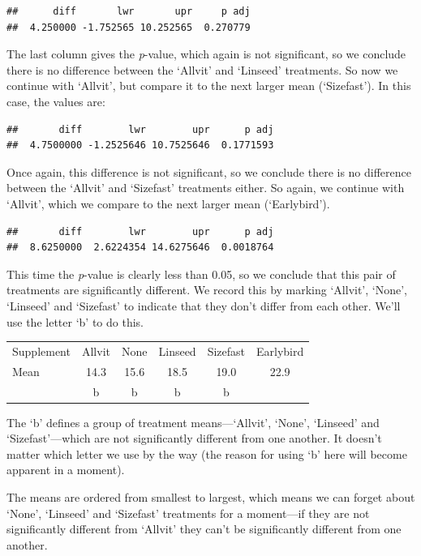 \documentclass[
]{book}
\begin{document}
\begin{verbatim}
##      diff       lwr       upr     p adj 
##  4.250000 -1.752565 10.252565  0.270779
\end{verbatim}

The last column gives the \emph{p}-value, which again is not significant, so we conclude there is no difference between the `Allvit' and `Linseed' treatments. So now we continue with `Allvit', but compare it to the next larger mean (`Sizefast'). In this case, the values are:

\begin{verbatim}
##       diff        lwr        upr      p adj 
##  4.7500000 -1.2525646 10.7525646  0.1771593
\end{verbatim}

Once again, this difference is not significant, so we conclude there is no difference between the `Allvit' and `Sizefast' treatments either. So again, we continue with `Allvit', which we compare to the next larger mean (`Earlybird').

\begin{verbatim}
##       diff        lwr        upr      p adj 
##  8.6250000  2.6224354 14.6275646  0.0018764
\end{verbatim}

This time the \emph{p}-value is clearly less than 0.05, so we conclude that this pair of treatments are significantly different. We record this by marking `Allvit', `None', `Linseed' and `Sizefast' to indicate that they don't differ from each other. We'll use the letter `b' to do this.

\begin{longtable}[]{@{}lccccc@{}}
\toprule
& & & & & \\
\midrule
\endhead
Supplement & Allvit & None & Linseed & Sizefast & Earlybird \\
Mean & 14.3 & 15.6 & 18.5 & 19.0 & 22.9 \\
& b & b & b & b & \\
\bottomrule
\end{longtable}

The `b' defines a group of treatment means---`Allvit', `None', `Linseed' and `Sizefast'---which are not significantly different from one another. It doesn't matter which letter we use by the way (the reason for using `b' here will become apparent in a moment).

The means are ordered from smallest to largest, which means we can forget about `None', `Linseed' and `Sizefast' treatments for a moment---if they are not significantly different from `Allvit' they can't be significantly different from one another.
\end{document}

